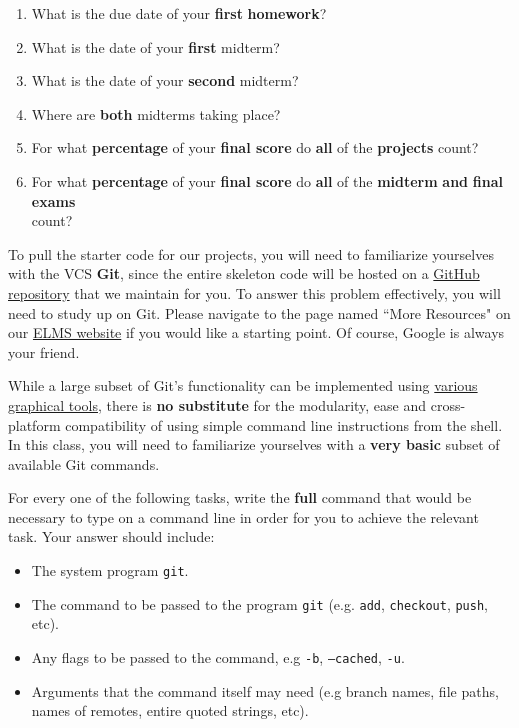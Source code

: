 \documentclass[letterpaper,12pt]{article}
\begin{document}
\begin{enumerate}[label=(\alph*)]
\setlength{\itemsep}{1.5em}
	\item What is the due date of your \textbf{first} \textbf{homework}? \myline{2in}
	\item What is the date of your \textbf{first} midterm? \myline{2in}
	\item What is the date of your \textbf{second} midterm? \myline{2in}
	\item Where are \textbf{both} midterms taking place? \myline{2in}
	\item For what \textbf{percentage} of your \textbf{final score} do \textbf{all} of the \textbf{projects} count?  \myline{1in}
	\item For what \textbf{percentage} of your \textbf{final score} do \textbf{all} of the \textbf{midterm} {\bf and}  \textbf{final exams} \\ count? \myline{1in}
\end{enumerate} \vspace{-.2in}
 
 \pagebreak


To pull the starter code for our projects, you will need to familiarize yourselves with the VCS \textbf{Git}, since the entire skeleton code will be hosted on a \href{https://github.com/JasonFil/CMSC420-Fall2018}{GitHub repository} that we maintain for you. To answer this problem effectively, you will need to study up on Git. Please navigate to the page named ``More Resources" on our \href{https://myelms.umd.edu/courses/1246980}{ELMS website} if you would like a starting point. Of course, Google is always your friend.

While a large subset of Git's functionality can be implemented using \href{https://git-scm.com/download/gui/linux}{various graphical tools}, there is {\bf no substitute} for the modularity, ease and cross-platform compatibility of using simple command line instructions from the shell. In this class, you will need to familiarize yourselves with a {\bf very basic} subset of available Git commands.

For every one of the following tasks, write the {\bf full} command that would be necessary to type on a command line in order for you to achieve the relevant task. Your answer should include: 
	\begin{itemize} \setlength{\itemsep}{.5em}
		\item The system program {\tt git}.
		\item The command to be passed to the program {\tt git} (e.g. {\tt add}, {\tt checkout}, {\tt push}, etc).
		\item Any flags to be passed to the command, e.g {\tt -b}, {\tt --cached}, {\tt -u}.
		\item Arguments that the command itself may need (e.g branch names, file paths, names of remotes, entire quoted strings, etc).
	\end{itemize}
	
\end{document}
